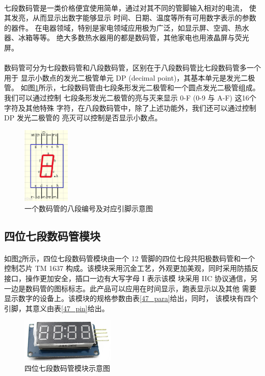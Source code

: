 \documentclass[UTF8, oneside]{ctexbook}
\begin{document}
\paragraph{}
七段数码管是一类价格便宜使用简单，通过对其不同的管脚输入相对的电流，
使其发亮，从而显示出数字能够显示 时间、日期、温度等所有可用数字表示的参数的器件。
在电器领域，特别是家电领域应用极为广泛，如显示屏、空调、热水器、冰箱等等。
绝大多数热水器用的都是数码管，其他家电也用液晶屏与荧光屏。

\paragraph{}
数码管可分为七段数码管和八段数码管，区别在于八段数码管比七段数码管多一个用于
显示小数点的发光二极管单元 DP (decimal point)，其基本单元是发光二极管。
如图\ref{8dp}所示，七段数码管由七段条形发光二极管和一个圆点发光二极管组成。我们可以通过控制
七段条形发光二极管的亮与灭来显示 0-F (0-9 与 A-F) 这16个字符及其他特殊
字符，在八段数码管中，除了上述功能外，我们还可以通过控制 DP 发光二极管的
亮灭可以控制是否显示小数点。

\begin{figure}[h]
    \centering
    \includegraphics[width=0.2\textwidth]{./result/sensor/1/1.png}
    \caption{一个数码管的八段编号及对应引脚示意图}
    \label{8dp}
\end{figure}

\subsection{四位七段数码管模块}
\paragraph{}
如图\ref{47}所示，四位七段数码管模块由一个 12 管脚的四位七段共阳极数码管和一个控制芯片 TM
1637 构成。该模块采用沉金工艺，外观更加美观，同时采用防插反接口，操作更加安全，插口一边有大写字母 I 表示该模
块采用 IIC 协议通信，另一边是数码管的图标标志。此产品可以应用在时间显示，跑表显示以及其他
需要显示数字的设备上。该模块的规格参数由表\ref{47_para}给出，同时，
该模块有四个引脚，其意义由表\ref{47_pin}给出。
\begin{figure}[h]
    \centering
    \includegraphics[width=0.4\textwidth]{./result/sensor/1/47.png}
    \caption{四位七段数码管模块示意图}
    \label{47}
\end{figure}
\end{document}
